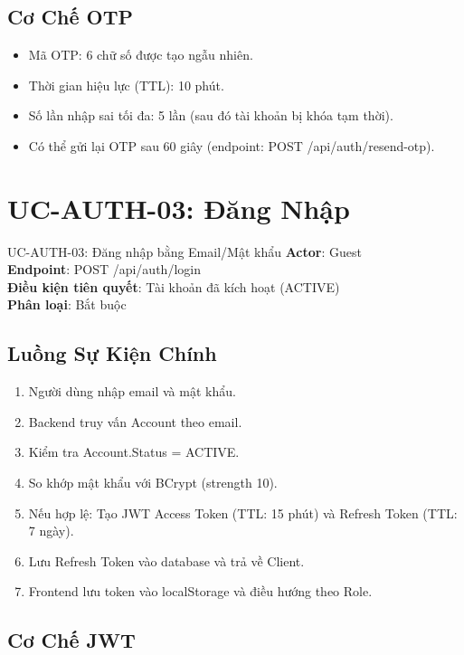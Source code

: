\documentclass[12pt, a4paper]{report}
\begin{document}
\subsection{Cơ Chế OTP}

\begin{itemize}
    \item Mã OTP: 6 chữ số được tạo ngẫu nhiên.
    \item Thời gian hiệu lực (TTL): 10 phút.
    \item Số lần nhập sai tối đa: 5 lần (sau đó tài khoản bị khóa tạm thời).
    \item Có thể gửi lại OTP sau 60 giây (endpoint: POST /api/auth/resend-otp).
\end{itemize}

\section{UC-AUTH-03: Đăng Nhập}

\begin{requirementbox}{UC-AUTH-03: Đăng nhập bằng Email/Mật khẩu}
\textbf{Actor}: Guest \\
\textbf{Endpoint}: POST /api/auth/login \\
\textbf{Điều kiện tiên quyết}: Tài khoản đã kích hoạt (ACTIVE) \\
\textbf{Phân loại}: Bắt buộc
\end{requirementbox}

\subsection{Luồng Sự Kiện Chính}

\begin{enumerate}
    \item Người dùng nhập email và mật khẩu.
    \item Backend truy vấn Account theo email.
    \item Kiểm tra Account.Status = ACTIVE.
    \item So khớp mật khẩu với BCrypt (strength 10).
    \item Nếu hợp lệ: Tạo JWT Access Token (TTL: 15 phút) và Refresh Token (TTL: 7 ngày).
    \item Lưu Refresh Token vào database và trả về Client.
    \item Frontend lưu token vào localStorage và điều hướng theo Role.
\end{enumerate}

\subsection{Cơ Chế JWT}
\end{document}
